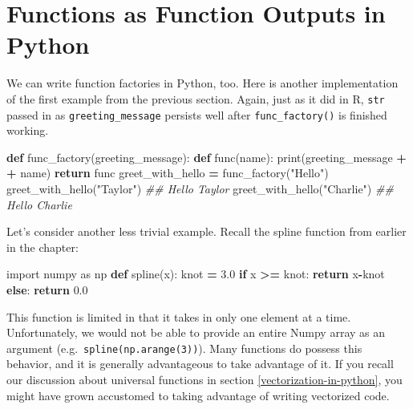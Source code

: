 \documentclass[
  12pt,
  krantz2]{krantz}
\makeatletter
\newenvironment{Shaded}{\begin{snugshade}}{\end{snugshade}}
\newcommand{\BuiltInTok}[1]{#1}
\newcommand{\CommentTok}[1]{\textcolor[rgb]{0.37,0.37,0.37}{\textit{#1}}}
\newcommand{\ControlFlowTok}[1]{\textcolor[rgb]{0.27,0.27,0.27}{\textbf{#1}}}
\newcommand{\FloatTok}[1]{\textcolor[rgb]{0.06,0.06,0.06}{#1}}
\newcommand{\ImportTok}[1]{#1}
\newcommand{\KeywordTok}[1]{\textcolor[rgb]{0.27,0.27,0.27}{\textbf{#1}}}
\newcommand{\NormalTok}[1]{#1}
\newcommand{\OperatorTok}[1]{\textcolor[rgb]{0.43,0.43,0.43}{\textbf{#1}}}
\newcommand{\StringTok}[1]{\textcolor[rgb]{0.5,0.5,0.5}{#1}}
\newenvironment{kframe}{%
\medskip{}
\setlength{\fboxsep}{.8em}
 \def\at@end@of@kframe{}%
 \ifinner\ifhmode%
  \def\at@end@of@kframe{\end{minipage}}%
  \begin{minipage}{\columnwidth}%
 \fi\fi%
 \def\FrameCommand##1{\hskip\@totalleftmargin \hskip-\fboxsep
 \colorbox{shadecolor}{##1}\hskip-\fboxsep
     \hskip-\linewidth \hskip-\@totalleftmargin \hskip\columnwidth}%
 \MakeFramed {\advance\hsize-\width
   \@totalleftmargin\z@ \linewidth\hsize
   \@setminipage}}%
 {\par\unskip\endMakeFramed%
 \at@end@of@kframe}
\renewenvironment{Shaded}{\begin{kframe}}{\end{kframe}}
\makeatother
\begin{document}
\hypertarget{functions-as-function-outputs-in-python}{%
\section{Functions as Function Outputs in Python}\label{functions-as-function-outputs-in-python}}

We can write function factories in Python, too. Here is another implementation of the first example from the previous section. Again, just as it did in R, \texttt{str} passed in as \texttt{greeting\_message} persists well after \texttt{func\_factory()} is finished working.

\begin{Shaded}
\begin{Highlighting}[]
\KeywordTok{def}\NormalTok{ func\_factory(greeting\_message):}
    \KeywordTok{def}\NormalTok{ func(name):}
        \BuiltInTok{print}\NormalTok{(greeting\_message }\OperatorTok{+} \StringTok{\textquotesingle{} \textquotesingle{}} \OperatorTok{+}\NormalTok{ name)}
    \ControlFlowTok{return}\NormalTok{ func}
\NormalTok{greet\_with\_hello }\OperatorTok{=}\NormalTok{ func\_factory(}\StringTok{"Hello"}\NormalTok{)}
\NormalTok{greet\_with\_hello(}\StringTok{"Taylor"}\NormalTok{)}
\CommentTok{\#\# Hello Taylor}
\NormalTok{greet\_with\_hello(}\StringTok{"Charlie"}\NormalTok{)}
\CommentTok{\#\# Hello Charlie}
\end{Highlighting}
\end{Shaded}

Let's consider another less trivial example. Recall the spline function from earlier in the chapter:

\begin{Shaded}
\begin{Highlighting}[]
\ImportTok{import}\NormalTok{ numpy }\ImportTok{as}\NormalTok{ np}
\KeywordTok{def}\NormalTok{ spline(x):}
\NormalTok{    knot }\OperatorTok{=} \FloatTok{3.0}
    \ControlFlowTok{if}\NormalTok{ x }\OperatorTok{\textgreater{}=}\NormalTok{ knot:}
        \ControlFlowTok{return}\NormalTok{ x}\OperatorTok{{-}}\NormalTok{knot}
    \ControlFlowTok{else}\NormalTok{:}
        \ControlFlowTok{return} \FloatTok{0.0}
\end{Highlighting}
\end{Shaded}

This function is limited in that it takes in only one element at a time. Unfortunately, we would not be able to provide an entire Numpy array as an argument (e.g.~\texttt{spline(np.arange(3))}). Many functions do possess this behavior, and it is generally advantageous to take advantage of it. If you recall our discussion about universal functions in section \ref{vectorization-in-python}, you might have grown accustomed to taking advantage of writing vectorized code.
\end{document}

